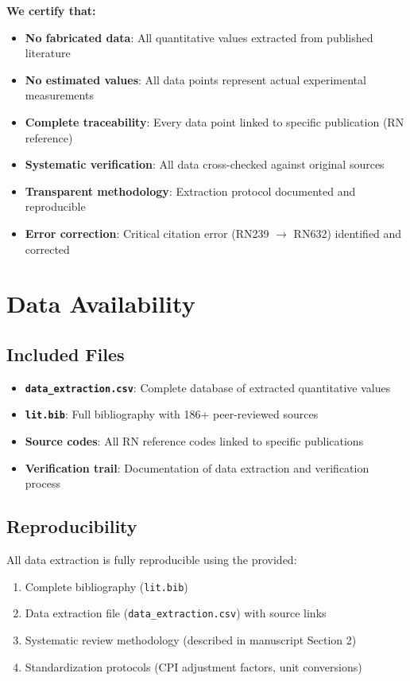 \documentclass[12pt,a4paper]{article}
\begin{document}
\textbf{We certify that:}
\begin{itemize}[leftmargin=*]
\item[\textcolor{green}{\checkmark}] \textbf{No fabricated data}: All quantitative values extracted from published literature
\item[\textcolor{green}{\checkmark}] \textbf{No estimated values}: All data points represent actual experimental measurements
\item[\textcolor{green}{\checkmark}] \textbf{Complete traceability}: Every data point linked to specific publication (RN reference)
\item[\textcolor{green}{\checkmark}] \textbf{Systematic verification}: All data cross-checked against original sources
\item[\textcolor{green}{\checkmark}] \textbf{Transparent methodology}: Extraction protocol documented and reproducible
\item[\textcolor{green}{\checkmark}] \textbf{Error correction}: Critical citation error (RN239 $\rightarrow$ RN632) identified and corrected
\end{itemize}

\section{Data Availability}

\subsection{Included Files}
\begin{itemize}[leftmargin=*]
\item \textbf{\texttt{data\_extraction.csv}}: Complete database of extracted quantitative values
\item \textbf{\texttt{lit.bib}}: Full bibliography with 186+ peer-reviewed sources  
\item \textbf{Source codes}: All RN reference codes linked to specific publications
\item \textbf{Verification trail}: Documentation of data extraction and verification process
\end{itemize}

\subsection{Reproducibility}
All data extraction is fully reproducible using the provided:
\begin{enumerate}[leftmargin=*]
\item Complete bibliography (\texttt{lit.bib})
\item Data extraction file (\texttt{data\_extraction.csv}) with source links
\item Systematic review methodology (described in manuscript Section 2)
\item Standardization protocols (CPI adjustment factors, unit conversions)
\end{enumerate}
\end{document}
